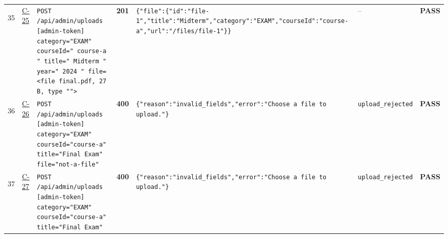 \documentclass[10pt,a4paper]{article}
\begin{document}
\begin{landscape}
\begin{longtable}{@{}P{0.6cm}P{0.9cm}P{8.5cm}P{1.0cm}P{6.2cm}P{4.2cm}P{1.1cm}@{}}
\hypertarget{call35}{35} & \hyperlink{test-C-25}{C-25} & \texttt{POST /\allowbreak{}api/\allowbreak{}admin/\allowbreak{}uploads [admin-\allowbreak{}token] category=\allowbreak{}"\allowbreak{}EXAM"\allowbreak{} courseId=\allowbreak{}"\allowbreak{} course-\allowbreak{}a "\allowbreak{} title=\allowbreak{}"\allowbreak{}  Midterm  "\allowbreak{} year=\allowbreak{}"\allowbreak{} 2024 "\allowbreak{} file=\allowbreak{}<file final.\allowbreak{}pdf,\allowbreak{} 27 B,\allowbreak{} type "\allowbreak{}"\allowbreak{}>} & \textcolor{passgreen}{\textbf{201}} & \texttt{\{"\allowbreak{}file"\allowbreak{}:\allowbreak{}\{"\allowbreak{}id"\allowbreak{}:\allowbreak{}"\allowbreak{}file-\allowbreak{}1"\allowbreak{},\allowbreak{}"\allowbreak{}title"\allowbreak{}:\allowbreak{}"\allowbreak{}Midterm"\allowbreak{},\allowbreak{}"\allowbreak{}category"\allowbreak{}:\allowbreak{}"\allowbreak{}EXAM"\allowbreak{},\allowbreak{}"\allowbreak{}courseId"\allowbreak{}:\allowbreak{}"\allowbreak{}course-\allowbreak{}a"\allowbreak{},\allowbreak{}"\allowbreak{}url"\allowbreak{}:\allowbreak{}"\allowbreak{}/\allowbreak{}files/\allowbreak{}file-\allowbreak{}1"\allowbreak{}\}\}} & -- & \textcolor{passgreen}{\textbf{PASS}} \\
\hypertarget{call36}{36} & \hyperlink{test-C-26}{C-26} & \texttt{POST /\allowbreak{}api/\allowbreak{}admin/\allowbreak{}uploads [admin-\allowbreak{}token] category=\allowbreak{}"\allowbreak{}EXAM"\allowbreak{} courseId=\allowbreak{}"\allowbreak{}course-\allowbreak{}a"\allowbreak{} title=\allowbreak{}"\allowbreak{}Final Exam"\allowbreak{} file=\allowbreak{}"\allowbreak{}not-\allowbreak{}a-\allowbreak{}file"\allowbreak{}} & \textcolor{warnamber}{\textbf{400}} & \texttt{\{"\allowbreak{}reason"\allowbreak{}:\allowbreak{}"\allowbreak{}invalid\_\allowbreak{}fields"\allowbreak{},\allowbreak{}"\allowbreak{}error"\allowbreak{}:\allowbreak{}"\allowbreak{}Choose a file to upload.\allowbreak{}"\allowbreak{}\}} & \texttt{upload\_\allowbreak{}rejected} & \textcolor{passgreen}{\textbf{PASS}} \\
\hypertarget{call37}{37} & \hyperlink{test-C-27}{C-27} & \texttt{POST /\allowbreak{}api/\allowbreak{}admin/\allowbreak{}uploads [admin-\allowbreak{}token] category=\allowbreak{}"\allowbreak{}EXAM"\allowbreak{} courseId=\allowbreak{}"\allowbreak{}course-\allowbreak{}a"\allowbreak{} title=\allowbreak{}"\allowbreak{}Final Exam"\allowbreak{}} & \textcolor{warnamber}{\textbf{400}} & \texttt{\{"\allowbreak{}reason"\allowbreak{}:\allowbreak{}"\allowbreak{}invalid\_\allowbreak{}fields"\allowbreak{},\allowbreak{}"\allowbreak{}error"\allowbreak{}:\allowbreak{}"\allowbreak{}Choose a file to upload.\allowbreak{}"\allowbreak{}\}} & \texttt{upload\_\allowbreak{}rejected} & \textcolor{passgreen}{\textbf{PASS}} \\

\end{longtable}
\end{landscape}
\end{document}
